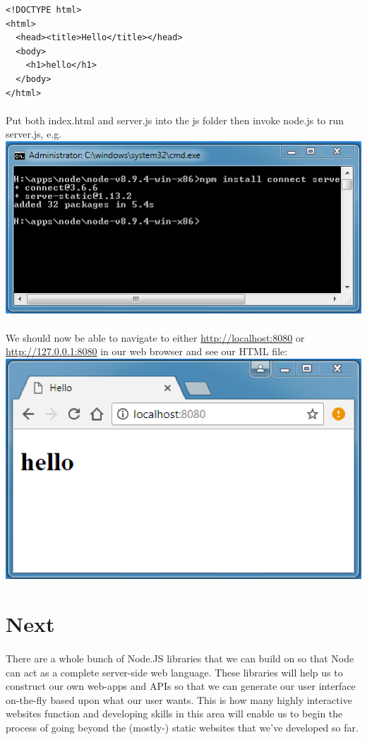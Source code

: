 \documentclass[10pt, a4paper, twosize]{article}
\begin{document}
\begin{lstlisting}
<!DOCTYPE html>
<html>
  <head><title>Hello</title></head>
  <body>
    <h1>hello</h1>
  </body>
</html>
\end{lstlisting}

\paragraph{} Put both index.html and server.js into the js folder then invoke node.js to run server.js, e.g.\\

\includegraphics[width=.8\textwidth]{images/node_serving}

\paragraph{} We should now be able to navigate to either \url{http://localhost:8080} or \url{http://127.0.0.1:8080} in our web browser and see our HTML file:\\

\includegraphics[width=.8\textwidth]{images/node_serving_hello}

\section{Next}
\paragraph{} There are a whole bunch of Node.JS libraries that we can build on so that Node can act as a complete server-side web language. These libraries will help us to construct our own web-apps and APIs so that we can generate our user interface on-the-fly based upon what our user wants. This is how many highly interactive websites function and developing skills in this area will enable us to begin the process of going beyond the (mostly-) static websites that we've developed so far. 

\end{document}
